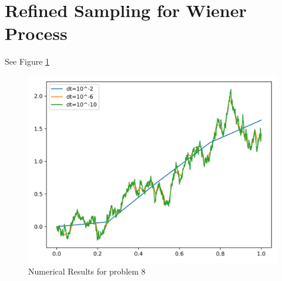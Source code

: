 \documentclass{article}
\begin{document}
\section{Refined Sampling for Wiener Process}
See Figure \ref{fig:p8}

\begin{figure}[th]
    \centering
    \includegraphics[width=\textwidth]{prob8.png}
    \caption{Numerical Results for problem 8}
    \label{fig:p8}
\end{figure}
\end{document}
